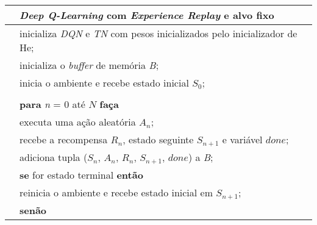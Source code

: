 \begin{tabular}{l l}

\hline
 & \textit{Deep Q-Learning} com \textit{Experience Replay} e alvo fixo\\
\hline

 & inicializa \textit{DQN} e \textit{TN} com pesos inicializados pelo inicializador de He;\\
 & inicializa o \textit{buffer} de memória \textit{B};\\
 & inicia o ambiente e recebe estado inicial $S_{0}$;\\
\\
 & \textbf{para} \textit{n} = 0 até $N$ \textbf{faça}\\
 & \qquad executa uma ação aleatória $A_{n}$;\\
 & \qquad recebe a recompensa $R_{n}$, estado seguinte $S_{n+1}$ e variável $done$;\\
 & \qquad adiciona tupla ($S_{n}$, $A_{n}$, $R_{n}$, $S_{n+1}$, $done$) a \textit{B};\\
 & \qquad \textbf{se} for estado terminal \textbf{então}\\
 & \qquad \qquad reinicia o ambiente e recebe estado inicial em $S_{n+1}$;\\
 & \qquad \textbf{senão}\\

\end{tabular}
